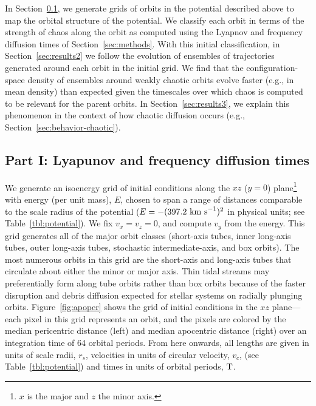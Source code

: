 \documentclass[letterpaper,12pt,preprint]{aastex}
\newcommand{\periods}{\ensuremath{{\rm T}}}
\begin{document}
In Section~\ref{sec:results1}, we generate grids of orbits in the potential described above to map the orbital structure of the potential. We classify each orbit in terms of the strength of chaos along the orbit as computed using the Lyapnov and frequency diffusion times of Section~\ref{sec:methods}. With this initial classification, in Section~\ref{sec:results2} we follow the evolution of ensembles of trajectories generated around each orbit in the initial grid. We find that the configuration-space density of ensembles around weakly chaotic orbits evolve faster (e.g., in mean density) than expected given the timescales over which chaos is computed to be relevant for the parent orbits. In Section~\ref{sec:results3}, we explain this phenomenon in the context of how chaotic diffusion occurs (e.g., Section~\ref{sec:behavior-chaotic}).

\subsection{Part I: Lyapunov and frequency diffusion times}\label{sec:results1}

We generate an isoenergy grid of initial conditions along the $xz$ ($y=0$) plane\footnote{$x$ is the major and $z$ the minor axis.} with energy (per unit mass), $E$, chosen to span a range of distances comparable to the scale radius of the potential ($E=-(397.2~{\rm km~s}^{-1})^2$ in physical units; see Table~\ref{tbl:potential}). We fix $v_x = v_z = 0$, and compute $v_y$ from the energy. This grid generates all of the major orbit classes (short-axis tubes, inner long-axis tubes, outer long-axis tubes, stochastic intermediate-axis, and box orbits). The most numerous orbits in this grid are the short-axis and long-axis tubes that circulate about either the minor or major axis. Thin tidal streams may preferentially form along tube orbits rather than box orbits because of the faster disruption and debris diffusion expected for stellar systems on radially plunging orbits. Figure~\ref{fig:apoper} shows the grid of initial conditions in the $xz$ plane---each pixel in this grid represents an orbit, and the pixels are colored by the median pericentric distance (left) and median apocentric distance (right) over an integration time of 64 orbital periods. From here onwards, all lengths are given in units of scale radii, $r_s$, velocities in units of circular velocity, $v_c$, (see Table~\ref{tbl:potential}) and times in units of orbital periods, $\periods$.
\end{document}
